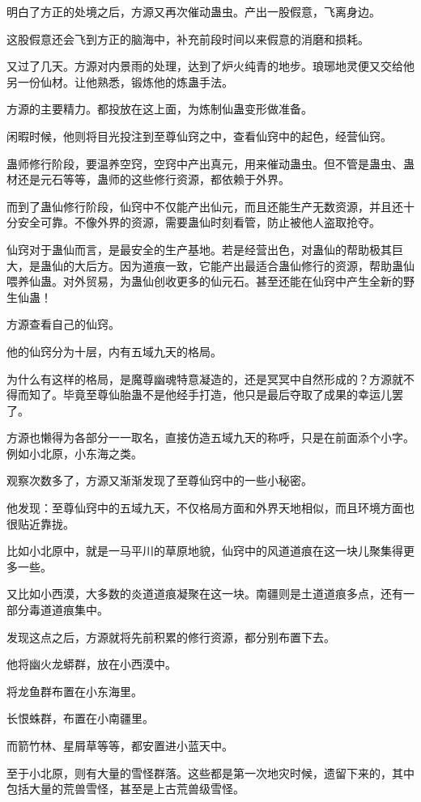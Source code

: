\begin{this_body}
明白了方正的处境之后，方源又再次催动蛊虫。产出一股假意，飞离身边。

这股假意还会飞到方正的脑海中，补充前段时间以来假意的消磨和损耗。

又过了几天。方源对内景雨的处理，达到了炉火纯青的地步。琅琊地灵便又交给他另一份仙材。让他熟悉，锻炼他的炼蛊手法。

方源的主要精力。都投放在这上面，为炼制仙蛊变形做准备。

闲暇时候，他则将目光投注到至尊仙窍之中，查看仙窍中的起色，经营仙窍。

蛊师修行阶段，要温养空窍，空窍中产出真元，用来催动蛊虫。但不管是蛊虫、蛊材还是元石等等，蛊师的这些修行资源，都依赖于外界。

而到了蛊仙修行阶段，仙窍中不仅能产出仙元，而且还能生产无数资源，并且还十分安全可靠。不像外界的资源，需要蛊仙时刻看管，防止被他人盗取抢夺。

仙窍对于蛊仙而言，是最安全的生产基地。若是经营出色，对蛊仙的帮助极其巨大，是蛊仙的大后方。因为道痕一致，它能产出最适合蛊仙修行的资源，帮助蛊仙喂养仙蛊。对外贸易，为蛊仙创收更多的仙元石。甚至还能在仙窍中产生全新的野生仙蛊！

方源查看自己的仙窍。

他的仙窍分为十层，内有五域九天的格局。

为什么有这样的格局，是魔尊幽魂特意凝造的，还是冥冥中自然形成的？方源就不得而知了。毕竟至尊仙胎蛊不是他经手打造，他只是最后夺取了成果的幸运儿罢了。

方源也懒得为各部分一一取名，直接仿造五域九天的称呼，只是在前面添个小字。例如小北原，小东海之类。

观察次数多了，方源又渐渐发现了至尊仙窍中的一些小秘密。

他发现：至尊仙窍中的五域九天，不仅格局方面和外界天地相似，而且环境方面也很贴近靠拢。

比如小北原中，就是一马平川的草原地貌，仙窍中的风道道痕在这一块儿聚集得更多一些。

又比如小西漠，大多数的炎道道痕凝聚在这一块。南疆则是土道道痕多点，还有一部分毒道道痕集中。

发现这点之后，方源就将先前积累的修行资源，都分别布置下去。

他将幽火龙蟒群，放在小西漠中。

将龙鱼群布置在小东海里。

长恨蛛群，布置在小南疆里。

而箭竹林、星屑草等等，都安置进小蓝天中。

至于小北原，则有大量的雪怪群落。这些都是第一次地灾时候，遗留下来的，其中包括大量的荒兽雪怪，甚至是上古荒兽级雪怪。


\end{this_body}
